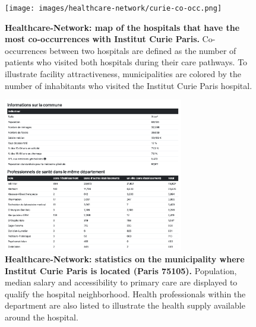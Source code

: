 \begin{figure}[H]
    \texttt{[image: images/healthcare-network/curie-co-occ.png]}
    \centering
    \caption{
        \textbf{Healthcare-Network: map of the hospitals that have the most co-occurrences with Institut Curie Paris.} Co-occurrences between two hospitals are defined as the number of patients who visited both hospitals during their care pathways. To illustrate facility attractiveness, municipalities are colored by the number of inhabitants who visited the Institut Curie Paris hospital.
    }
    \label{fig:hn-curie-co-occ}
\end{figure}


\begin{figure}[H]
    \includegraphics[width=0.7\textwidth]{images/healthcare-network/curie-commune.png}
    \centering
    \caption{
        \textbf{Healthcare-Network: statistics on the municipality where Institut Curie Paris is located (Paris 75105).} Population, median salary and accessibility to primary care are displayed to qualify the hospital neighborhood. Health professionals within the department are also listed to illustrate the health supply available around the hospital.
    }
    \label{fig:hn-curie-commune}
\end{figure}
